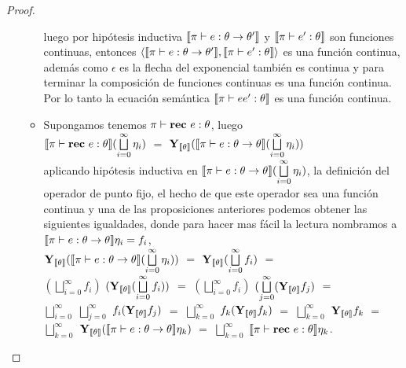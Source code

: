 \begin{proof}
\begin{itemize}
\begin{itemize}
luego por hip\'otesis inductiva $\llbracket \pi \vdash e : \theta \rightarrow \theta' \rrbracket$ y
$\llbracket \pi \vdash e' : \theta \rrbracket$ son funciones continuas, entonces
$\langle \llbracket \pi \vdash e : \theta \rightarrow \theta' \rrbracket
					     ,\llbracket \pi \vdash e' : \theta \rrbracket \rangle$ es una funci\'on continua,
adem\'as como $\epsilon$ es la flecha del exponencial tambi\'en es continua y para
terminar la composici\'on de funciones continuas es una funci\'on continua. Por lo tanto
la ecuaci\'on sem\'antica $\llbracket \pi \vdash ee' : \theta \rrbracket$ es una funci\'on 
continua.

\item Supongamos tenemos $\pi \vdash \textbf{rec} \ e : \theta$, luego\\

$\llbracket \pi \vdash \textbf{rec} \ e : \theta \rrbracket(\bigsqcup\limits^{\infty}_{i=0} \eta_i)$ $=$ 
$\textbf{Y}_{\llbracket \theta \rrbracket}
	(\llbracket \pi \vdash e : \theta \rightarrow \theta \rrbracket (\bigsqcup\limits^{\infty}_{i=0} \eta_i))$\\
	
aplicando hip\'otesis inductiva en $\llbracket \pi \vdash e : \theta \rightarrow \theta \rrbracket (\bigsqcup\limits^{\infty}_{i=0} \eta_i)$, la definici\'on del operador de punto fijo,
el hecho de que este operador sea una funci\'on continua y una de las proposiciones
anteriores podemos obtener las siguientes igualdades, donde para hacer mas f\'acil la
lectura nombramos a $\llbracket \pi \vdash e : \theta \rightarrow \theta \rrbracket\eta_i = f_i$,\\

$\textbf{Y}_{\llbracket \theta \rrbracket}
	(\llbracket \pi \vdash e : \theta \rightarrow \theta \rrbracket (\bigsqcup\limits^{\infty}_{i=0} \eta_i))$ $=$
$\textbf{Y}_{\llbracket \theta \rrbracket}
	(\bigsqcup\limits^{\infty}_{i=0} f_i)$ $=$\\

$(\bigsqcup\limits^{\infty}_{i=0} f_i)$ $(\textbf{Y}_{\llbracket \theta \rrbracket}(\bigsqcup\limits^{\infty}_{i=0} f_i))$ $=$
$(\bigsqcup\limits^{\infty}_{i=0} f_i)$ $(\bigsqcup\limits^{\infty}_{j=0} (\textbf{Y}_{\llbracket \theta \rrbracket}f_j)$ $=$\\

$\bigsqcup\limits^{\infty}_{i=0}$ $\bigsqcup\limits^{\infty}_{j=0}$ $f_i (\textbf{Y}_{\llbracket \theta \rrbracket}f_j)$ $=$
$\bigsqcup\limits^{\infty}_{k=0}$ $f_k (\textbf{Y}_{\llbracket \theta \rrbracket}f_k)$ $=$
$\bigsqcup\limits^{\infty}_{k=0}$ $\textbf{Y}_{\llbracket \theta \rrbracket}f_k$ $=$\\

$\bigsqcup\limits^{\infty}_{k=0}$ $\textbf{Y}_{\llbracket \theta \rrbracket}(\llbracket \pi \vdash e : \theta \rightarrow \theta \rrbracket\eta_k)$ $=$ 
$\bigsqcup\limits^{\infty}_{k=0}$ $\llbracket \pi \vdash \textbf{rec} \ e : \theta \rrbracket \eta_k$.\\


\end{itemize}
\end{itemize}
\end{proof}
